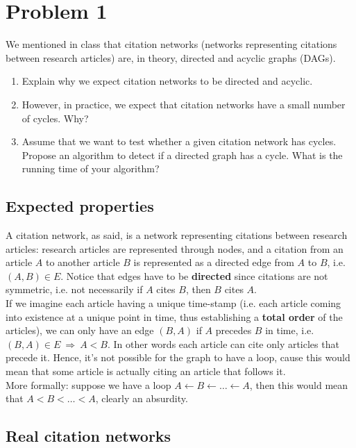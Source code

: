 
\section{Problem 1}

We mentioned in class that citation networks (networks representing
citations between research articles) are, in theory, directed and
acyclic graphs (DAGs).
\begin{enumerate}
	\item Explain why we expect citation networks to be directed and acyclic.
	\item However, in practice, we expect that citation networks have a small
	number of cycles. Why?
	\item Assume that we want to test whether a given citation network has
	cycles. Propose an algorithm to detect if a directed graph has a
	cycle. What is the running time of your algorithm?
\end{enumerate}


\subsection{Expected properties}

A citation network, as said, is a network representing citations between
research articles: research articles are represented through nodes, and
a citation from an article $A$ to another
article $B$ is represented as a directed edge from
$A$ to $B$, i.e. $\left(A,B\right) \in E$. Notice that
edges have to be \textbf{directed} since citations are not symmetric,
i.e. not necessarily if $A$ cites $B$, then
$B$ cites $A$.\\
If we imagine each article having a unique time-stamp (i.e. each article
coming into existence at a unique point in time, thus establishing
a \textbf{total order} of the articles), we can only have an edge
$\left(B, A\right)$ if $A$ precedes $B$ in time,
i.e. $\left(B,A\right) \in E \ \Rightarrow \ A < B$. In other words each article can cite only
articles that precede it. Hence, it's not possible for the graph to have a loop, cause this would
mean that some article is actually citing an article that follows it.\\
More formally: suppose we have a loop $A \leftarrow B \leftarrow \dots \leftarrow A$, then this would mean that $A < B < \dots < A$, clearly an absurdity.

\subsection{Real citation networks}

